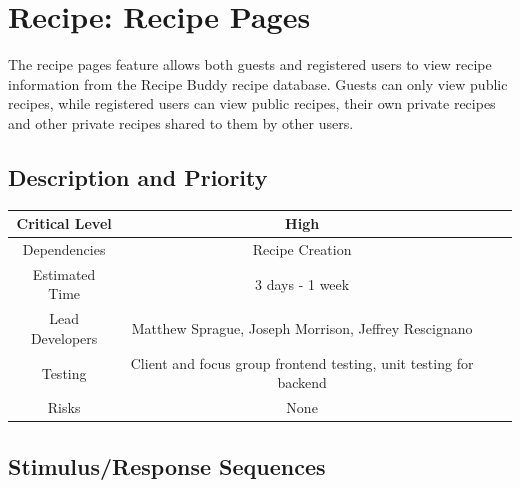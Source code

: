 \documentclass{scrreprt}
\begin{document}
\section{Recipe: Recipe Pages}

The recipe pages feature allows both guests and registered users to view recipe information from the \gls{Recipe Buddy} recipe database. Guests can only view public recipes, while registered users can view public recipes, their own private recipes and other private recipes shared to them by other users.

\subsection{Description and Priority}
\begin{center}
    \begin{tabular}{| c | c | c | c |}
        \hline
        Critical Level  & High                                                                 \\
        \hline
        Dependencies    & Recipe Creation                                                      \\
        \hline
        Estimated Time  & 3 days - 1 week                                                      \\
        \hline
        Lead Developers & Matthew Sprague, Joseph Morrison, Jeffrey Rescignano \\
        \hline
        Testing         & Client and focus group \gls{frontend} testing,
                          \gls{unit testing} for \gls{backend}                                 \\
        \hline
        Risks           & None                                                                 \\
        \hline
    \end{tabular}
\end{center}

\subsection{Stimulus/Response Sequences}
\end{document}

